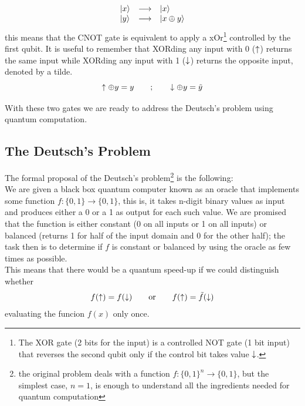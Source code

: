\begin{equation}
  \begin{array}{lcl}
    |x\rangle & \longrightarrow & |x\rangle \\
    |y\rangle & \longrightarrow & |x\oplus y\rangle
  \end{array}
\end{equation}
this means that the CNOT gate is equivalent to apply a \ac{xOr}\footnote{The XOR gate (2 bits for the input) is a controlled NOT gate (1 bit input) that reverses the second qubit only if the control bit takes value $\downarrow$.} controlled by the first qubit. It is useful to remember that XORding any input with 0 ($\uparrow$) returns the same input while XORding any input with 1 ($\downarrow$) returns the opposite input, denoted by a tilde.
\begin{equation}
  \uparrow\oplus y = y \quad\quad;\quad\quad \downarrow\oplus y = \tilde{y}
\end{equation}

With these two gates we are ready to address the Deutsch's problem using quantum computation.

\subsection{The Deutsch's Problem}
The formal proposal of the Deutsch's problem\footnote{the original problem deals with a function $f:\{ 0,1\}^n\rightarrow\{ 0,1\}$, but the simplest case, $n=1$, is enough to understand all the ingredients needed for quantum computation} is the following:\\

We are given a black box quantum computer known as an oracle that implements some function $f:\{ 0,1\}\rightarrow\{ 0,1\}$, this is, it takes n-digit binary values as input and produces either a 0 or a 1 as output for each such value. We are promised that the function is either constant (0 on all inputs or 1 on all inputs) or balanced (returns 1 for half of the input domain and 0 for the other half); the task then is to determine if $f$ is constant or balanced by using the oracle as few times as possible. \\

This means that there would be a quantum speed-up if we could distinguish whether
\begin{equation}
  f(\uparrow) = f(\downarrow) \quad\quad \text{or}\quad\quad f(\uparrow) = \tilde{f}(\downarrow)
  \label{problem}
\end{equation}
evaluating the funcion $f(x)$ only once.\\

